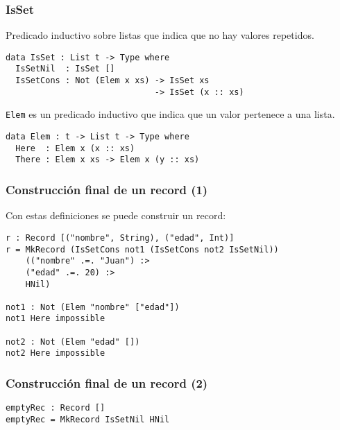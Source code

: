 \documentclass{beamer}
\begin{document}
\begin{frame}[fragile]
\frametitle{IsSet}

Predicado inductivo sobre listas que indica que no hay valores repetidos.

\pause

\begin{definition}
\begin{verbatim}
data IsSet : List t -> Type where
  IsSetNil  : IsSet []
  IsSetCons : Not (Elem x xs) -> IsSet xs
                              -> IsSet (x :: xs)
\end{verbatim}
\end{definition}

\pause

\texttt{Elem} es un predicado inductivo que indica que un valor pertenece a una lista.

\begin{definition}
\begin{verbatim}
data Elem : t -> List t -> Type where
  Here  : Elem x (x :: xs)
  There : Elem x xs -> Elem x (y :: xs)
\end{verbatim}
\end{definition}

\end{frame}

\begin{frame}[fragile]
\frametitle{Construcción final de un record (1)}

Con estas definiciones se puede construir un record:

\begin{example}
\begin{verbatim}
r : Record [("nombre", String), ("edad", Int)]
r = MkRecord (IsSetCons not1 (IsSetCons not2 IsSetNil)) 
    (("nombre" .=. "Juan") :>
    ("edad" .=. 20) :>
    HNil)

not1 : Not (Elem "nombre" ["edad"])
not1 Here impossible

not2 : Not (Elem "edad" [])
not2 Here impossible
\end{verbatim}
\end{example}
\end{frame}

\begin{frame}[fragile]
\frametitle{Construcción final de un record (2)}

\begin{example}
\begin{verbatim}
emptyRec : Record []
emptyRec = MkRecord IsSetNil HNil
\end{verbatim}
\end{example}

\end{frame}
\end{document}
